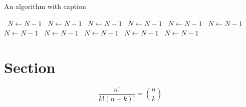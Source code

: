 \documentclass[a4paper]{article}
\begin{document}
\begin{algorithm}
\caption{An algorithm with caption}
\begin{algorithmic}
\    \State $N \gets N - 1$
\    \State $N \gets N - 1$
\    \State $N \gets N - 1$
\    \State $N \gets N - 1$
\    \State $N \gets N - 1$
\    \State $N \gets N - 1$
\    \State $N \gets N - 1$
\    \State $N \gets N - 1$
\    \State $N \gets N - 1$
\    \State $N \gets N - 1$
\    \State $N \gets N - 1$
\EndWhile
\end{algorithmic}
\end{algorithm}

\section{Section}

\[ \frac{n!}{k!(n-k)!} = \binom{n}{k} \]
\end{document}
